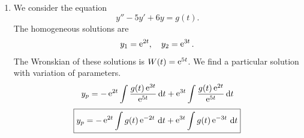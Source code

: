 {\begin{Solution}
\begin{enumerate}
\begin{align*}
      &= - \cos(t) \int \frac{\sin^2(t)}{\cos(t)} \,\dd t
      + \sin(t) \int \sin(t) \,\dd t \\
      &= \cos(t) \left( \ln \left( \frac{ \cos(t/2) - \sin(t/2) }
          { \cos(t/2) + \sin(t/2) }
          + \sin(t) \right) \right)
      - \sin(t) \cos(t)
    \end{align*}
    \[
    \boxed{
      y_p = \cos(t) \ln \left( \frac{ \cos(t/2) - \sin(t/2) }{ \cos(t/2) + \sin(t/2) }
      \right)
      }
    \]
  \item 
    We consider the equation
    \[
    y'' - 5 y' + 6 y = g(t).
    \]
    The homogeneous solutions are
    \[
    y_1 = \mathop{\mathrm{e}}\nolimits^{2t}, \quad y_2 = \mathop{\mathrm{e}}\nolimits^{3t}.
    \]
    The Wronskian of these solutions is $W(t) = \mathop{\mathrm{e}}\nolimits^{5 t}$.
    We find a particular solution with variation of parameters.
    \[
    y_p = - \mathop{\mathrm{e}}\nolimits^{2t} \int \frac{ g(t) \mathop{\mathrm{e}}\nolimits^{3t} }{ \mathop{\mathrm{e}}\nolimits^{5t} } \,\mathrm{d} t
    + \mathop{\mathrm{e}}\nolimits^{3t} \int \frac{ g(t) \mathop{\mathrm{e}}\nolimits^{2t} }{ \mathop{\mathrm{e}}\nolimits^{5t} } \,\mathrm{d} t
    \]
    \[
    \boxed{
      y_p = - \mathop{\mathrm{e}}\nolimits^{2t} \int g(t) \mathop{\mathrm{e}}\nolimits^{-2 t} \,\mathrm{d} t + \mathop{\mathrm{e}}\nolimits^{3t} \int g(t) \mathop{\mathrm{e}}\nolimits^{-3 t} \,\mathrm{d} t
      }
    \]
  \end{enumerate}
\end{Solution}









}
